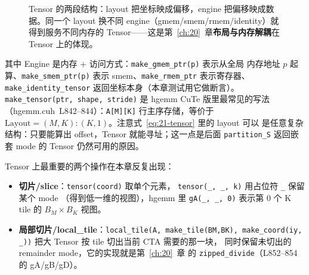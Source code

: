\begin{figure}[htbp]
\caption{Tensor 的两段结构：layout 把坐标映成偏移，engine 把偏移映成数据。同一个 layout 换不同 engine（gmem/smem/rmem/identity）就得到服务不同内存的 Tensor——这是第~\ref{ch:20}~章\textbf{布局与内存解耦}在 Tensor 上的体现。}
\label{fig:21-1}
\end{figure}

其中 Engine 是内存 $+$ 访问方式：\texttt{make\_\allowbreak{}gmem\_\allowbreak{}ptr\allowbreak{}(p)} 表示从全局
内存地址 $p$ 起算、\texttt{make\_\allowbreak{}smem\_\allowbreak{}ptr\allowbreak{}(p)} 表示 smem、\texttt{make\_\allowbreak{}rmem\_\allowbreak{}ptr}
表示寄存器、\texttt{make\_\allowbreak{}identity\_\allowbreak{}tensor} 返回坐标本身（本章测试用它做断言）。
\texttt{make\_\allowbreak{}tensor\allowbreak{}(ptr,\allowbreak{} shape,\allowbreak{} stride)} 是 hgemm CuTe 版里最常见的写法
（hgemm.cuh~L842--844）：\texttt{A[M][K]} 行主序存储，等价于
$\mathrm{Layout} = (M,K){:}(K,1)$。注意式~\eqref{eq:21-tensor} 里的 layout 可以
是任意复杂结构：只要能算出 offset，Tensor 就能寻址；这一点是后面
\texttt{partition\_S} 返回嵌套 mode 的 Tensor 仍然可用的原因。

Tensor 上最重要的两个操作在本章反复出现：

\begin{itemize}
  \item \textbf{切片/slice}：\texttt{tensor\allowbreak{}(coord)} 取单个元素，
        \texttt{tensor(\_, \_, k)} 用占位符 \texttt{\_} 保留某个 mode
        （得到低一维的视图），hgemm 里
        \texttt{gA(\_, \_, 0)} 表示第 0 个 K tile 的 $B_M\times B_K$ 视图。
  \item \textbf{局部切片/local\_tile}：\texttt{local\_\allowbreak{}tile\allowbreak{}(A,\allowbreak{} make\_\allowbreak{}tile\allowbreak{}(BM,\allowbreak{}BK),\allowbreak{}
        make\_\allowbreak{}coord\allowbreak{}(iy,\allowbreak{} \_\allowbreak{}))} 把大 Tensor 按 tile 切出当前 CTA 需要的那一块，
        同时保留未切出的 remainder mode，它的实现就是第~\ref{ch:20}~章
        的 \texttt{zipped\_\allowbreak{}divide}（L852--854 的 gA/gB/gD）。
\end{itemize}

